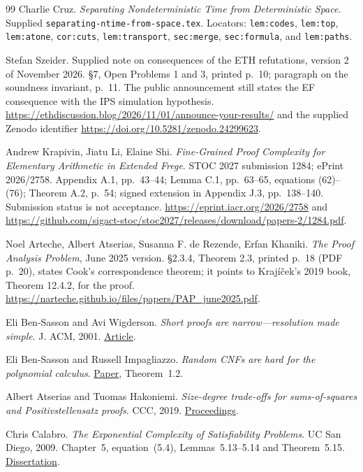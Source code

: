 \documentclass[11pt]{article}
\theoremstyle{definition}
\theoremstyle{remark}
\begin{document}
\begin{thebibliography}{99}
 Charlie Cruz. \emph{Separating Nondeterministic Time from
Deterministic Space}. Supplied
\texttt{separating-ntime-from-space.tex}.
Locators: \texttt{lem:codes}, \texttt{lem:top},
\texttt{lem:atone}, \texttt{cor:cuts}, \texttt{lem:transport},
\texttt{sec:merge}, \texttt{sec:formula}, and \texttt{lem:paths}.

 Stefan Szeider. Supplied note on consequences of the ETH
refutations, version 2 of November 2026. \S7, Open Problems
1 and 3, printed p.~10; paragraph on the soundness invariant,
p.~11. The public announcement still states the EF consequence
with the IPS simulation hypothesis.
\url{https://ethdiscussion.blog/2026/11/01/announce-your-results/}
and the supplied Zenodo identifier
\url{https://doi.org/10.5281/zenodo.24299623}.

 Andrew Krapivin, Jiatu Li, Elaine Shi.
\emph{Fine-Grained Proof Complexity for Elementary Arithmetic in
Extended Frege}. STOC 2027 submission 1284; ePrint 2026/2758.
Appendix A.1, pp.~43--44; Lemma C.1, pp.~63--65, equations
(62)--(76); Theorem A.2, p.~54; signed extension in Appendix J.3,
pp.~138--140. Submission status is not acceptance.
\url{https://eprint.iacr.org/2026/2758}
and
\url{https://github.com/sigact-stoc/stoc2027/releases/download/papers-2/1284.pdf}.

 Noel Arteche, Albert Atserias, Susanna F. de Rezende,
Erfan Khaniki. \emph{The Proof Analysis Problem}, June 2025
version. \S2.3.4, Theorem 2.3, printed p.~18 (PDF p.~20),
states Cook's correspondence theorem; it points to
Kraj\'i\v{c}ek's 2019 book, Theorem 12.4.2, for the proof.
\url{https://narteche.github.io/files/papers/PAP_june2025.pdf}.

 Eli Ben-Sasson and Avi Wigderson.
\emph{Short proofs are narrow---resolution made simple}. J. ACM, 2001.
\href{https://doi.org/10.1145/375827.375835}{Article}.

 Eli Ben-Sasson and Russell Impagliazzo.
\emph{Random CNFs are hard for the polynomial calculus}.
\href{https://www.ias.edu/sites/default/files/math/csdm/10-11/ebensasson_random_cnfs_are_hard.pdf}{Paper}, Theorem~1.2.

 Albert Atserias and Tuomas Hakoniemi.
\emph{Size-degree trade-offs for sums-of-squares and Positivstellensatz proofs}.
CCC, 2019. \href{https://doi.org/10.4230/LIPIcs.CCC.2019.24}{Proceedings}.

 Chris Calabro. \emph{The Exponential Complexity of
Satisfiability Problems}. UC San Diego, 2009. Chapter~5, equation~(5.4),
Lemmas~5.13--5.14 and Theorem~5.15.
\href{https://cseweb.ucsd.edu/~ccalabro/thesis.pdf}{Dissertation}.


\end{thebibliography}
\end{document}
